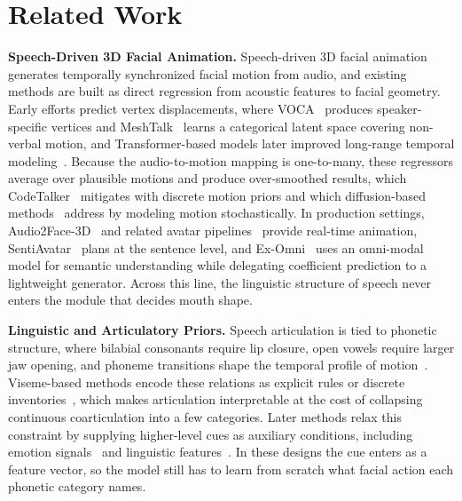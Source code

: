 \section{Related Work}
\label{sec:related}

\noindent\textbf{Speech-Driven 3D Facial Animation.}\quad
Speech-driven 3D facial animation generates temporally synchronized facial motion from audio, and existing methods are built as direct regression from acoustic features to facial geometry. Early efforts predict vertex displacements, where VOCA~\citep{cudeiro2019voca} produces speaker-specific vertices and MeshTalk~\citep{richard2021meshtalk} learns a categorical latent space covering non-verbal motion, and Transformer-based models later improved long-range temporal modeling~\citep{fan2022faceformer,fan2024unitalker}. Because the audio-to-motion mapping is one-to-many, these regressors average over plausible motions and produce over-smoothed results, which CodeTalker~\citep{xing2023codetalker} mitigates with discrete motion priors and which diffusion-based methods~\citep{park2023said,stan2023facediffuser,sun2025vividtalk} address by modeling motion stochastically. In production settings, Audio2Face-3D~\citep{chung2025audio2face} and related avatar pipelines~\citep{wei2024aniportrait,lin2025cyberhost,sun2024uniavatar,zhen2025teller} provide real-time animation, SentiAvatar~\citep{jin2026sentiavatar} plans at the sentence level, and Ex-Omni~\citep{zhang2026ex} uses an omni-modal model for semantic understanding while delegating coefficient prediction to a lightweight generator. Across this line, the linguistic structure of speech never enters the module that decides mouth shape.

\noindent\textbf{Linguistic and Articulatory Priors.}\quad
Speech articulation is tied to phonetic structure, where bilabial consonants require lip closure, open vowels require larger jaw opening, and phoneme transitions shape the temporal profile of motion~\citep{cohen1993modeling,taylor2012dynamic,edwards2016jali}. Viseme-based methods encode these relations as explicit rules or discrete inventories~\citep{zhou2018visemenet,taylor2017deep,bao2023learning}, which makes articulation interpretable at the cost of collapsing continuous coarticulation into a few categories. Later methods relax this constraint by supplying higher-level cues as auxiliary conditions, including emotion signals~\citep{peng2023emotalk,danvevcek2023emotional,gan2023efficient,jin2026sentiavatar} and linguistic features~\citep{fan2022joint,xu2024kmtalk,wu2025keyframeface}. In these designs the cue enters as a feature vector, so the model still has to learn from scratch what facial action each phonetic category names.

